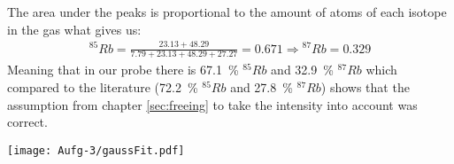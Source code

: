 The area under the peaks is proportional to the amount of atoms of each isotope in the gas what gives us:
\begin{gather}
    ^{85}Rb = \frac{23.13+48.29}{7.79+23.13+48.29+27.27} = 0.671 \Rightarrow  {^{87}Rb} = 0.329
\end{gather}
Meaning that in our probe there is \SI{67.1}{\percent} $^{85}Rb$ and \SI{32.9}{\percent} $^{87}Rb$ which compared to the literature \citep{RDL85,RDL87} (\SI{72.2}{\percent} $^{85}Rb$ and \SI{27.8}{\percent} $^{87}Rb$) shows that the assumption from chapter \ref{sec:freeing} to take the intensity into account was correct.
\begin{center}
    \texttt{[image: Aufg-3/gaussFit.pdf]}
    \label{image:gaussFit}
\end{center}
